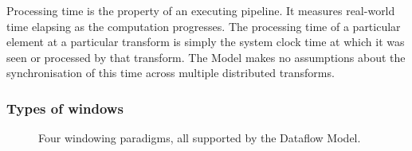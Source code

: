 Processing time is the property of an executing pipeline.
It measures real-world time elapsing as the computation progresses.
The processing time of a particular element at a particular transform is simply the system clock time at which it was seen or processed by that transform.
The Model makes no assumptions about the synchronisation of this time across multiple distributed transforms.

\subsubsection{Types of windows}

\begin{figure}[t]
	\caption{Four windowing paradigms, all supported by the Dataflow Model.}
	\label{fig:prep:window-types}
\end{figure}

